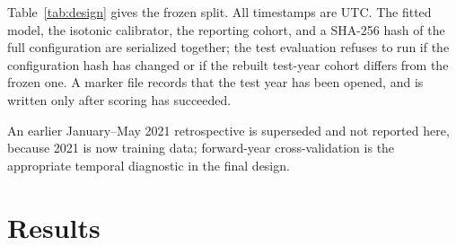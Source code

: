 \documentclass[10pt,twocolumn,letterpaper]{article}
\begin{document}
Table~\ref{tab:design} gives the frozen split. All timestamps are UTC. The
fitted model, the isotonic calibrator, the reporting cohort, and a SHA-256 hash
of the full configuration are serialized together; the test evaluation refuses
to run if the configuration hash has changed or if the rebuilt test-year cohort
differs from the frozen one. A marker file records that the test year has been
opened, and is written only after scoring has succeeded.

An earlier January--May 2021 retrospective is superseded and not reported here,
because 2021 is now training data; forward-year cross-validation is the
appropriate temporal diagnostic in the final design.

\section{Results}\label{sec:results}
\end{document}
